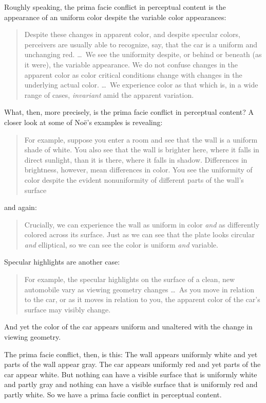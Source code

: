\documentclass[12pt]{article}
\begin{document}
Roughly speaking, the prima facie conflict in perceptual content is the appearance of an uniform color despite the variable color appearances:
	\begin{quote}
		Despite these changes in apparent color, and despite specular colors, perceivers are usually able to recognize, say, that the car is a uniform and unchanging red. \ldots\ We see the uniformity despite, or behind or beneath (as it were), the variable appearance. We do not confuse changes in the apparent color as color critical conditions change with changes in the underlying actual color. \ldots\ We experience color as that which is, in a wide range of cases, \emph{invariant} amid the apparent variation. \citep[127]{Noe:2004fk}
	\end{quote}

What, then, more precisely, is the prima facie conflict in perceptual content? A closer look at some of Noë's examples is revealing:
	\begin{quote}
		For example, suppose you enter a room and see that the wall is a uniform shade of white. You also see that the wall is brighter here, where it falls in direct sunlight, than it is there, where it falls in shadow. Differences in brightness, however, mean differences in color. You see the uniformity of color despite the evident nonuniformity of different parts of the wall's surface \citep[127]{Noe:2004fk}
	\end{quote}
and again:
	\begin{quote}
		Crucially, we can experience the wall as uniform in color \emph{and} as differently colored across its surface. Just as we can see that the plate looks circular \emph{and} elliptical, so we can see the color is uniform \emph{and} variable. \citep[129]{Noe:2004fk}
	\end{quote}
Specular highlights are another case:
	\begin{quote}
		For example, the specular highlights on the surface of a clean, new automobile vary as viewing geometry changes \ldots\ As you move in relation to the car, or as it moves in relation to you, the apparent color of the car's surface may visibly change. \citep[125]{Noe:2004fk}
	\end{quote}
And yet the color of the car appears uniform and unaltered with the change in viewing geometry.

The prima facie conflict, then, is this: The wall appears uniformly white and yet parts of the wall appear gray. The car appears uniformly red and yet parts of the car appear white. But nothing can have a visible surface that is uniformly white and partly gray and nothing can have a visible surface that is uniformly red and partly white. So we have a prima facie conflict in perceptual content.
\end{document}
